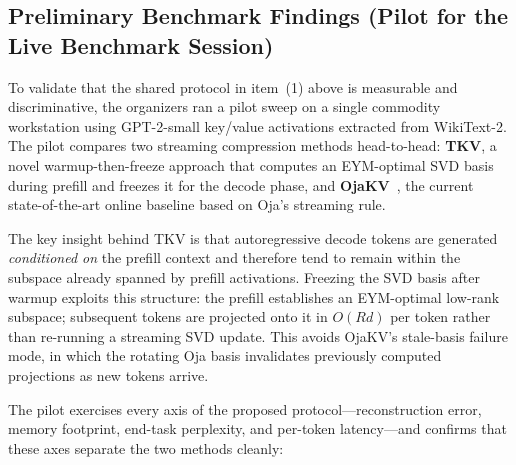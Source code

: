 \documentclass{article}
\begin{document}
\subsection*{Preliminary Benchmark Findings (Pilot for the Live Benchmark Session)}

To validate that the shared protocol in item~(1) above is measurable and
discriminative, the organizers ran a pilot sweep on a single commodity
workstation using GPT-2-small key/value activations extracted from WikiText-2.
The pilot compares two streaming compression methods head-to-head:
\textbf{TKV}, a novel warmup-then-freeze approach that computes an
EYM-optimal SVD basis during prefill and freezes it for the decode phase, and
\textbf{OjaKV}~\cite{ojakov2025}, the current state-of-the-art online baseline
based on Oja's streaming rule.

The key insight behind TKV is that autoregressive decode tokens are
generated \emph{conditioned on} the prefill context and therefore tend to remain
within the subspace already spanned by prefill activations.  Freezing the
SVD basis after warmup exploits this structure: the prefill establishes an
EYM-optimal low-rank subspace; subsequent tokens are projected onto it in
$O(Rd)$ per token rather than re-running a streaming SVD update.  This avoids
OjaKV's stale-basis failure mode, in which the rotating Oja basis invalidates
previously computed projections as new tokens arrive.

The pilot exercises every axis of the proposed protocol---reconstruction error,
memory footprint, end-task perplexity, and per-token latency---and confirms
that these axes separate the two methods cleanly:
\end{document}
